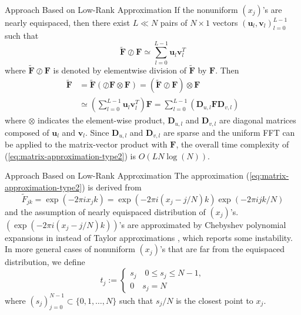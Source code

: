 \documentclass{beamer}
\begin{document}
\begin{frame}{Approach Based on Low-Rank Approximation}
  If the nonuniform $(x_j)$'s are nearly equispaced, then there exist $L \ll N$ pairs of $N \times 1$
  vectors $(\bm{u}_l, \bm{v}_l)_{l=0}^{L-1}$ such that
  \begin{equation}
    \bm{\tilde{F}}\oslash\bm{F} \simeq
    \sum_{l=0}^{L-1}\bm{u}_{l}\bm{v}_{l}^{T}
  \end{equation}
  where $\tilde{\bm{F}}\oslash\bm{F}$ is denoted by elementwise division of $\tilde{\bm{F}}$ by $\bm{F}$. Then
  \begin{align}
       \tilde{\bm{F}}
    &= \tilde{\bm{F}}\left(\oslash\bm{F}\otimes\bm{F}\right)
     = \left(\tilde{\bm{F}}\oslash\bm{F}\right)\otimes\bm{F} \\
    &\simeq \left(\sum_{l=0}^{L-1}\bm{u}_{l}\bm{v}_{l}^{T}\right)\bm{F}
     = \sum_{l=0}^{L-1}\left(\bm{D}_{u,l}\bm{F}\bm{D}_{v,l}\right)
    \label{eq:matrix-approximation-type2}
  \end{align}
  where $\otimes$ indicates the element-wise product,
  $\bm{D}_{u,l}$ and $\bm{D}_{v,l}$ are diagonal matrices composed of $\bm{u}_{l}$ and $\bm{v}_{l}$.
  Since $\bm{D}_{u,l}$ and $\bm{D}_{v,l}$ are sparse and the uniform FFT can be applied to the matrix-vector product with $\bm{F}$, the overall time complexity of (\ref{eq:matrix-approximation-type2})
  is $O(L N \log(N))$.
\end{frame}

\begin{frame}{Approach Based on Low-Rank Approximation}
  The approximation (\ref{eq:matrix-approximation-type2}) is derived from
  \begin{equation}
      \tilde{F}_{jk} = \exp(-2\pi i x_j k)
    = \exp(-2\pi i (x_j - j/N)k)\exp(-2\pi i jk/N)
  \end{equation}
  and the assumption of nearly equispaced distribution of $(x_j)$'s.
  $(\exp(-2\pi i (x_j - j/N)k))$'s are approximated by Chebyshev polynomial expansions
  in \cite{SISC-2018-Townsend} instead of Taylor approximations \cite{SISC-1996-Anderson},
  which reports some instability.
  In more general cases of nonuniform $(x_j)$'s that are far from the equispaced distribution,
  we define
  \begin{equation}
    t_{j} :=
    \begin{cases}
      s_{j} \quad 0 \le s_{j} \le N-1, \\
      0     \quad s_{j} = N
    \end{cases}
  \end{equation}
  where $(s_{j})_{j=0}^{N-1} \subset \{0, 1, \dots, N\}$ such that
  $s_{j}/N$ is the closest point to $x_{j}$.
\end{frame}
\end{document}
